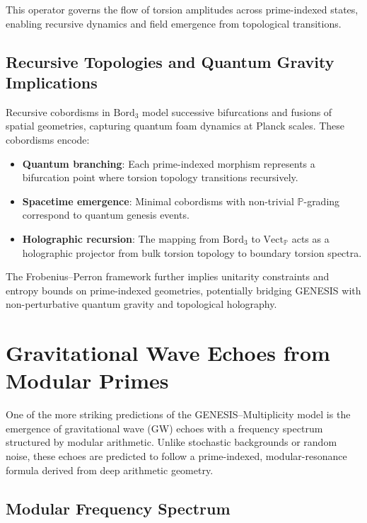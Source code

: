 \documentclass{article}
\theoremstyle{plain}
\begin{document}
This operator governs the flow of torsion amplitudes across prime-indexed states, enabling recursive dynamics and field emergence from topological transitions.

\subsection{Recursive Topologies and Quantum Gravity Implications}

Recursive cobordisms in $\text{Bord}_3$ model successive bifurcations and fusions of spatial geometries, capturing quantum foam dynamics at Planck scales. These cobordisms encode:
\begin{itemize}
    \item \textbf{Quantum branching}: Each prime-indexed morphism represents a bifurcation point where torsion topology transitions recursively.
    \item \textbf{Spacetime emergence}: Minimal cobordisms with non-trivial $\mathbb{P}$-grading correspond to quantum genesis events.
    \item \textbf{Holographic recursion}: The mapping from $\text{Bord}_3$ to $\text{Vect}_{\mathbb{P}}$ acts as a holographic projector from bulk torsion topology to boundary torsion spectra.
\end{itemize}

The Frobenius–Perron framework further implies unitarity constraints and entropy bounds on prime-indexed geometries, potentially bridging GENESIS with non-perturbative quantum gravity and topological holography.

\section{Gravitational Wave Echoes from Modular Primes}

One of the more striking predictions of the GENESIS–Multiplicity model is the emergence of gravitational wave (GW) echoes with a frequency spectrum structured by modular arithmetic. Unlike stochastic backgrounds or random noise, these echoes are predicted to follow a prime-indexed, modular-resonance formula derived from deep arithmetic geometry.

\subsection{Modular Frequency Spectrum}
\end{document}
